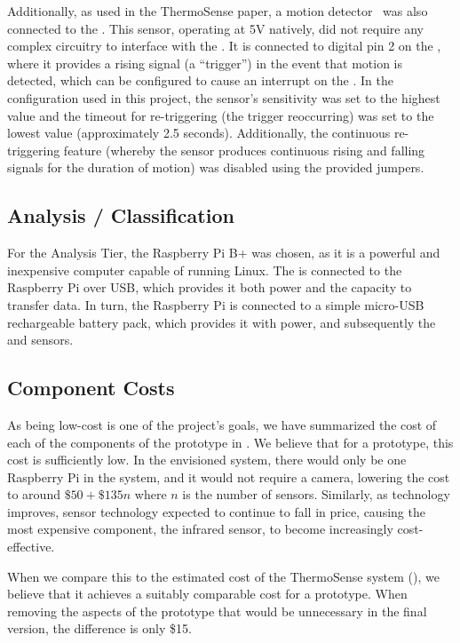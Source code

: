 \documentclass[../thesis/thesis.tex]{subfiles}
\begin{document}
Additionally, as used in the ThermoSense paper, a \pir motion detector~\cite{AdafruitPIR} was also connected to the \ard. This sensor, operating at 5V natively, did not require any complex circuitry to interface with the \ard. It is connected to digital pin 2 on the \ard, where it provides a rising signal (a ``trigger'') in the event that motion is detected, which can be configured to cause an interrupt on the \ard. In the configuration used in this project, the sensor's sensitivity was set to the highest value and the timeout for re-triggering (the trigger reoccurring) was set to the lowest value (approximately 2.5 seconds). Additionally, the continuous re-triggering feature (whereby the sensor produces continuous rising and falling signals for the duration of motion) was disabled using the provided jumpers. 

\subsection{Analysis / Classification}

For the Analysis Tier, the Raspberry Pi B+ was chosen, as it is a powerful and inexpensive computer capable of running Linux. The \ard is connected to the Raspberry Pi over USB, which provides it both power and the capacity to transfer data. In turn, the Raspberry Pi is connected to a simple micro-USB rechargeable battery pack, which provides it with power, and subsequently the \ard and sensors.

\subsection{Component Costs}
\label{subsec:cost}

As being low-cost is one of the project's goals, we have summarized the cost of each of the components of the prototype in . We believe that for a prototype, this cost is sufficiently low. In the envisioned system, there would only be one Raspberry Pi in the system, and it would not require a camera, lowering the cost to around $\$50 + \$135n$ where $n$ is the number of sensors. Similarly, as technology improves, sensor technology expected to continue to fall in price, causing the most expensive component, the infrared sensor, to become increasingly cost-effective.

When we compare this to the estimated cost of the ThermoSense system (), we believe that it achieves a suitably comparable cost for a prototype. When removing the aspects of the prototype that would be unnecessary in the final version, the difference is only \$15.
\end{document}
